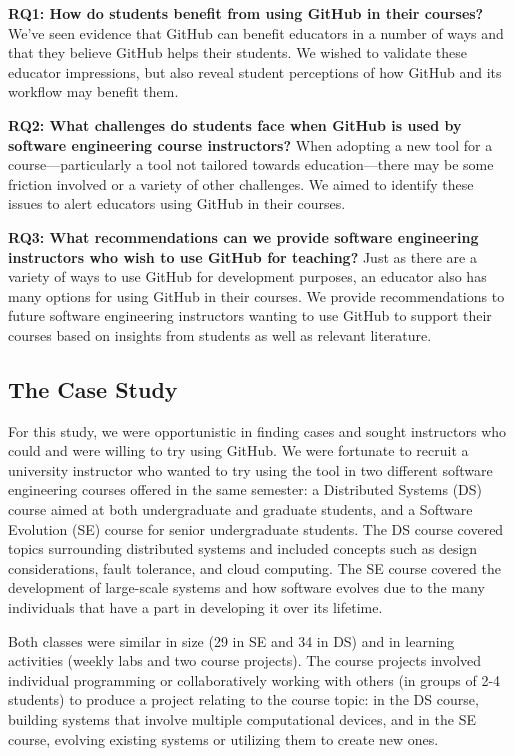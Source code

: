 \textbf{RQ1: How do students benefit from using GitHub in their courses?} We've seen evidence that GitHub can benefit educators in a number of ways \cite{zagalsky2015emergence} and that they believe GitHub helps their students. We wished to validate these educator impressions, but also reveal student perceptions of how GitHub and its workflow may benefit them.

\textbf{RQ2: What challenges do students face when GitHub is used by software engineering course instructors?} When adopting a new tool for a course---particularly a tool not tailored towards education---there may be some friction involved or a variety of other challenges. We aimed to identify these issues to alert educators using GitHub in their courses.

\textbf{RQ3: What recommendations can we provide software engineering instructors who wish to use GitHub for teaching?} Just as there are a variety of ways to use GitHub for development purposes, an educator also has many options for using GitHub in their courses. We provide recommendations to future software engineering instructors wanting to use GitHub to support their courses based on insights from students as well as relevant literature.

\subsection{The Case Study}
For this study, we were opportunistic in finding cases and sought instructors who could and were willing to try using GitHub. We were fortunate to recruit a university instructor who wanted to try using the tool in two different software engineering courses offered in the same semester: a Distributed Systems (DS) course aimed at both undergraduate and graduate students, and a Software Evolution (SE) course for senior undergraduate students. The DS course covered topics surrounding distributed systems and included concepts such as design considerations, fault tolerance, and cloud computing. The SE course covered the development of large-scale systems and how software evolves due to the many individuals that have a part in developing it over its lifetime.

Both classes were similar in size (29 in SE and 34 in DS) and in learning activities (weekly labs and two course projects). The course projects involved individual programming or collaboratively working with others (in groups of 2-4 students) to produce a project relating to the course topic: in the DS course, building systems that involve multiple computational devices, and in the SE course, evolving existing systems or utilizing them to create new ones.

